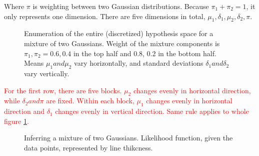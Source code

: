 \documentclass[11pt]{article}
\begin{document}
Where $\pi$ is weighting between two Gaussian distributions. Because $\pi_1 + \pi_2 = 1$, it only represents one dimension. There are five dimensions in total, $\mu_1, \delta_1, \mu_2, \delta_2, \pi$.

\begin{figure}[H]
\centering
 \caption{Enumeration of the entire (discretized) hypothesis space for a mixture of two Gaussians. Weight of the mixture components is $\pi_1, \pi_2 = 0.6, 0.4$ in the top half and 0.8, 0.2 in the bottom half. Means $\mu_1 and \mu_2$ vary horizontally, and standard deviations $\delta_1 and \delta_2$ vary vertically.}
 \label{fig:enumeration4}
\end{figure}

\textcolor{red}{For the first row, there are five blocks. $\mu_2$ changes evenly in horizontal direction, while $\delta_2 and \pi$ are fixed. Within each block, $\mu_1$ changes evenly in horizontal direction and $\delta_1$ changes evenly in vertical direction. Same rule applies to whole figure \ref{fig:enumeration4}.}

\begin{figure}[H]
\centering
 \caption{Inferring a mixture of two Gaussians. Likelihood function, given the data points, represented by line thikcness.}
 \label{fig:enumeration5}
\end{figure}
\end{document}
